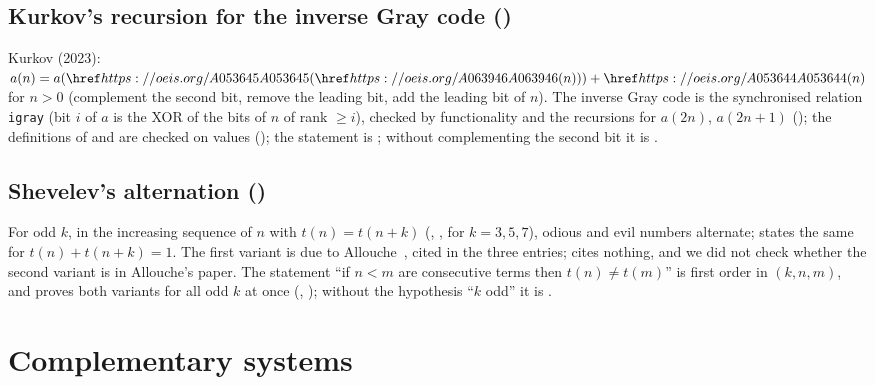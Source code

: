\subsection{Kurkov's recursion for the inverse Gray code ()}\label{s:A006068}
Kurkov (2023): $a(n)=a(\oeis{A053645}(\oeis{A063946}(n)))+\oeis{A053644}(n)$ for $n>0$ (complement the second
bit, remove the leading bit, add the leading bit of $n$). The inverse Gray code is the synchronised relation
\texttt{igray} (bit $i$ of $a$ is the XOR of the bits of $n$ of rank $\ge i$), checked by functionality and the
recursions for $a(2n)$, $a(2n+1)$ (\TRUE); the definitions of  and  are checked on
values (\TRUE); the statement is \TRUE; without complementing the second bit it is \FALSE.

\subsection{Shevelev's alternation ()}\label{s:A161580}
For odd $k$, in the increasing sequence of $n$ with $t(n)=t(n+k)$ (, ,
 for $k=3,5,7$), odious and evil numbers alternate;  states the same for
$t(n)+t(n+k)=1$. The first variant is due to Allouche~\cite{All}, cited in the three entries; 
cites nothing, and we did not check whether the second variant is in Allouche's paper. The statement ``if
$n<m$ are consecutive terms then $t(n)\ne t(m)$'' is first order in $(k,n,m)$, and \Walnut{} proves both variants
for all odd $k$ at once (\TRUE, \TRUE); without the hypothesis ``$k$ odd'' it is \FALSE.

\section{Complementary systems}\label{s:systems}

